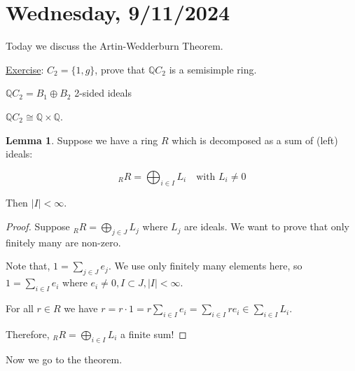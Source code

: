 \documentclass{article}
\theoremstyle{definition}
\newtheorem{lemma}[theorem]{Lemma}
\begin{document}
\section*{Wednesday, 9/11/2024}

Today we discuss the Artin-Wedderburn Theorem.

\underline{Exercise}: \(C_2 = \{ 1, g \}\), prove that \(\mathbb{Q} C_2\) is a semisimple ring.

\(\mathbb{Q} C_2 = B_1 \oplus B_2\) 2-sided ideals

\(\mathbb{Q} C_2 \cong \mathbb{Q} \times \mathbb{Q}\). 

\begin{lemma}
    Suppose we have a ring \(R\) which is decomposed as a sum of (left) ideals:

    \[
        _R R = \bigoplus_{i\in I} L_i \quad \text{with \(L_i \neq 0\)} 
    \]

    Then \(\vert I \vert < \infty\).
\end{lemma}

\begin{proof}
    Suppose \(_R R = \bigoplus_{j\in J} L_j\) where \(L_j\) are ideals. We want to prove that only finitely many are non-zero.

    Note that, \(1 = \sum_{j\in J} e_j\). We use only finitely many elements here, so \(1 = \sum_{i\in I} e_i\) where \(e_i \neq 0, I \subset J, \vert I \vert < \infty\).

    For all \(r\in R\) we have \(r = r \cdot 1 = r \sum_{i\in I} e_i = \sum_{i\in I} r e_i \in \sum_{i\in I} L_i\).
    
    Therefore, \(_R R = \bigoplus_{i\in I} L_i\) a finite sum!
\end{proof}

Now we go to the theorem.
\end{document}

